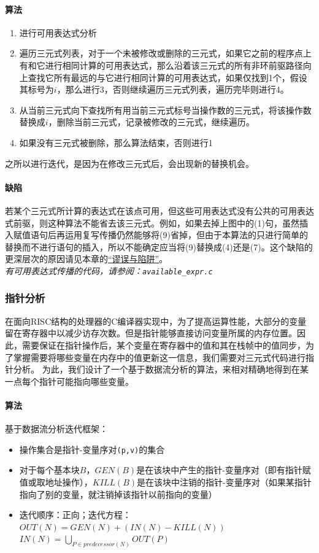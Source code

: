 \paragraph*{算法}
\begin{enumerate}
	\item 进行可用表达式分析
	\item 遍历三元式列表，对于一个未被修改或删除的三元式，如果它之前的程序点上有和它进行相同计算的可用表达式，那么沿着该三元式的所有非环前驱路径向上查找它所有最远的与它进行相同计算的可用表达式，如果仅找到1个，假设其标号为$i$，那么进行3，否则继续遍历三元式列表，遍历完毕则进行4。
	\item 从当前三元式向下查找所有用当前三元式标号当操作数的三元式，将该操作数替换成$i$，删除当前三元式，记录被修改的三元式，继续遍历。
	\item 如果没有三元式被删除，那么算法结束，否则进行1
\end{enumerate}
之所以进行迭代，是因为在修改三元式后，会出现新的替换机会。
\paragraph*{缺陷}
若某个三元式所计算的表达式在该点可用，但这些可用表达式没有公共的可用表达式前驱，则这种算法不能省去该三元式。例如，如果去掉上图中的(1)句，虽然插入赋值语句后再运用复写传播仍然能够将(9)省掉，但由于本算法的只进行简单的替换而不进行语句的插入，所以不能确定应当将(9)替换成(4)还是(7)。这个缺陷的更深层次的原因请见本章的\hyperref[pitfallc2]{“谬误与陷阱”}。\\

{\it \anchor 有可用表达式传播的代码，请参阅：\verb|available_expr.c|}\\
\subsubsection{指针分析}
在面向RISC结构的处理器的C编译器实现中，为了提高运算性能，大部分的变量留在寄存器中以减少访存次数。但是指针能够直接访问变量所属的内存位置。因此，需要保证在指针操作后，某个变量在寄存器中的值和其在栈帧中的值同步，为了掌握需要将哪些变量在内存中的值更新这一信息，我们需要对三元式代码进行指针分析。
为此，我们设计了一个基于数据流分析的算法，来相对精确地得到在某一点每个指针可能指向哪些变量。
\paragraph*{算法}基于数据流分析迭代框架：
\begin{itemize}
\item 操作集合是指针-变量序对\verb|(p,v)|的集合
\item 对于每个基本块$B$，$GEN(B)$是在该块中产生的指针-变量序对（即有指针赋值或取地址操作），$KILL(B)$是在该块中注销的指针-变量序对（如果某指针指向了别的变量，就注销掉该指针以前指向的变量）
\item 迭代顺序：正向；迭代方程：$OUT(N) = GEN(N)+(IN(N)-KILL(N))$\\$IN(N)=\bigcup_{P\in predecessor(N)}OUT(P)$
\end{itemize}
